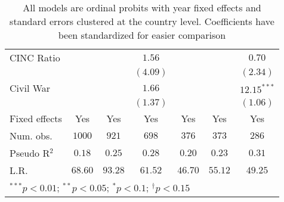 \begin{table}[h]
\begin{center}
\begin{tabular}{l c c c c c c}
CINC Ratio                        &              &                   & $1.56$           &                   &                   & $0.70$        \\
                                  &              &                   & $(4.09)$         &                   &                   & $(2.34)$      \\
Civil War                         &              &                   & $1.66$           &                   &                   & $12.15^{***}$ \\
                                  &              &                   & $(1.37)$         &                   &                   & $(1.06)$      \\
\hline
Fixed effects                     & Yes          & Yes               & Yes              & Yes               & Yes               & Yes           \\
Num. obs.                         & $1000$       & $921$             & $698$            & $376$             & $373$             & $286$         \\
Pseudo R$^2$                      & $0.18$       & $0.25$            & $0.28$           & $0.20$            & $0.23$            & $0.31$        \\
L.R.                              & $68.60$      & $93.28$           & $61.52$          & $46.70$           & $55.12$           & $49.25$       \\
\hline
\multicolumn{7}{l}{\scriptsize{$^{***}p<0.01$; $^{**}p<0.05$; $^{*}p<0.1$; $^{\dagger}p<0.15$}}
\end{tabular}
\caption{All models are ordinal probits with year fixed effects and standard errors clustered at the country level. Coefficients have been standardized for easier comparison}
\label{table:model}
\end{center}
\end{table}
